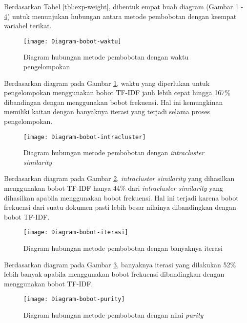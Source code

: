 \begin{enumerate}
		Berdasarkan Tabel \ref{tbl:exp-weight}, dibentuk empat buah diagram (Gambar \ref{fig:graph:weight-time} - \ref{fig:graph:weight-purity}) untuk menunjukan hubungan antara metode pembobotan dengan keempat variabel terikat.
		
		\begin{figure}[H]
			\centering
			\texttt{[image: Diagram-bobot-waktu]}
			\caption{Diagram hubungan metode pembobotan dengan waktu pengelompokan}
			\label{fig:graph:weight-time}
		\end{figure}
		
		Berdasarkan diagram pada Gambar \ref{fig:graph:weight-time}, waktu yang diperlukan untuk pengelompokan menggunakan bobot TF-IDF jauh lebih cepat hingga 167\% dibandingan dengan menggunakan bobot frekuensi. Hal ini kemungkinan memiliki kaitan dengan banyaknya iterasi yang terjadi selama proses pengelompokan.
		
		\begin{figure}[H]
			\centering
			\texttt{[image: Diagram-bobot-intracluster]}
			\caption{Diagram hubungan metode pembobotan dengan \textit{intracluster similarity}}
			\label{fig:graph:weight-intra}
		\end{figure}
		
		Berdasarkan diagram pada Gambar \ref{fig:graph:weight-intra}, \textit{intracluster similarity} yang dihasilkan menggunakan bobot TF-IDF hanya 44\% dari \textit{intracluster similarity} yang dihasilkan apabila menggunakan bobot frekuensi. Hal ini terjadi karena bobot frekuensi dari suatu dokumen pasti lebih besar nilainya dibandingkan dengan bobot TF-IDF.
		
		\begin{figure}[H]
			\centering
			\texttt{[image: Diagram-bobot-iterasi]}
			\caption{Diagram hubungan metode pembobotan dengan banyaknya iterasi}
			\label{fig:graph:weight-iteration}
		\end{figure}
		
		Berdasarkan diagram pada Gambar \ref{fig:graph:weight-iteration}, banyaknya iterasi yang dilakukan 52\% lebih banyak apabila menggunakan bobot frekuensi dibandingkan dengan menggunakan bobot TF-IDF.
		
		\begin{figure}[H]
			\centering
			\texttt{[image: Diagram-bobot-purity]}
			\caption{Diagram hubungan metode pembobotan dengan nilai \textit{purity}}
			\label{fig:graph:weight-purity}
		\end{figure}
		

\end{enumerate}
